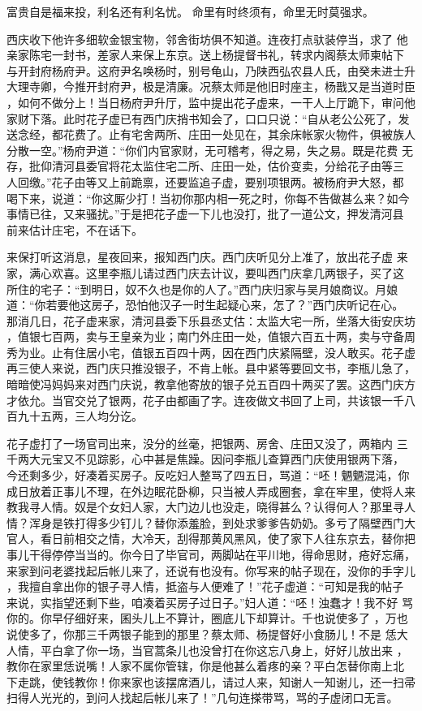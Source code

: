 富贵自是福来投，利名还有利名忧。
命里有时终须有，命里无时莫强求。

西庆收下他许多细软金银宝物，邻舍街坊俱不知道。连夜打点驮装停当，求了
他亲家陈宅一封书，差家人来保上东京。送上杨提督书礼，转求内阁蔡太师柬帖下
与开封府杨府尹。这府尹名唤杨时，别号龟山，乃陕西弘农县人氏，由癸未进士升
大理寺卿，今推开封府尹，极是清廉。况蔡太师是他旧时座主，杨戬又是当道时臣
，如何不做分上！当日杨府尹升厅，监中提出花子虚来，一干人上厅跪下，审问他
家财下落。此时花子虚已有西门庆捎书知会了，口口只说：“自从老公公死了，发
送念经，都花费了。止有宅舍两所、庄田一处见在，其余床帐家火物件，俱被族人
分散一空。”杨府尹道：“你们内官家财，无可稽考，得之易，失之易。既是花费
无存，批仰清河县委官将花太监住宅二所、庄田一处，估价变卖，分给花子由等三
人回缴。”花子由等又上前跪禀，还要监追子虚，要别项银两。被杨府尹大怒，都
喝下来，说道：“你这厮少打！当初你那内相一死之时，你每不告做甚么来？如今
事情已往，又来骚扰。”于是把花子虚一下儿也没打，批了一道公文，押发清河县
前来估计庄宅，不在话下。

来保打听这消息，星夜回来，报知西门庆。西门庆听见分上准了，放出花子虚
来家，满心欢喜。这里李瓶儿请过西门庆去计议，要叫西门庆拿几两银子，买了这
所住的宅子：“到明日，奴不久也是你的人了。”西门庆归家与吴月娘商议。月娘
道：“你若要他这房子，恐怕他汉子一时生起疑心来，怎了？”西门庆听记在心。
那消几日，花子虚来家，清河县委下乐县丞丈估：太监大宅一所，坐落大街安庆坊
，值银七百两，卖与王皇亲为业；南门外庄田一处，值银六百五十两，卖与守备周
秀为业。止有住居小宅，值银五百四十两，因在西门庆紧隔壁，没人敢买。花子虚
再三使人来说，西门庆只推没银子，不肯上帐。县中紧等要回文书，李瓶儿急了，
暗暗使冯妈妈来对西门庆说，教拿他寄放的银子兑五百四十两买了罢。这西门庆方
才依允。当官交兑了银两，花子由都画了字。连夜做文书回了上司，共该银一千八
百九十五两，三人均分讫。

花子虚打了一场官司出来，没分的丝毫，把银两、房舍、庄田又没了，两箱内
三千两大元宝又不见踪影，心中甚是焦躁。因问李瓶儿查算西门庆使用银两下落，
今还剩多少，好凑着买房子。反吃妇人整骂了四五日，骂道：“呸！魉魉混沌，你
成日放着正事儿不理，在外边眠花卧柳，只当被人弄成圈套，拿在牢里，使将人来
教我寻人情。奴是个女妇人家，大门边儿也没走，晓得甚么？认得何人？那里寻人
情？浑身是铁打得多少钉儿？替你添羞脸，到处求爹爹告奶奶。多亏了隔壁西门大
官人，看日前相交之情，大冷天，刮得那黄风黑风，使了家下人往东京去，替你把
事儿干得停停当当的。你今日了毕官司，两脚站在平川地，得命思财，疮好忘痛，
来家到问老婆找起后帐儿来了，还说有也没有。你写来的帖子现在，没你的手字儿
，我擅自拿出你的银子寻人情，抵盗与人便难了！”花子虚道：“可知是我的帖子
来说，实指望还剩下些，咱凑着买房子过日子。”妇人道：“呸！浊蠢才！我不好
骂你的。你早仔细好来，囷头儿上不算计，圈底儿下却算计。千也说使多了
，万也说使多了，你那三千两银子能到的那里？蔡太师、杨提督好小食肠儿！不是
恁大人情，平白拿了你一场，当官蒿条儿也没曾打在你这忘八身上，好好儿放出来
，教你在家里恁说嘴！人家不属你管辖，你是他甚么着疼的亲？平白怎替你南上北
下走跳，使钱教你！你来家也该摆席酒儿，请过人来，知谢人一知谢儿，还一扫帚
扫得人光光的，到问人找起后帐儿来了！”几句连搽带骂，骂的子虚闭口无言。

